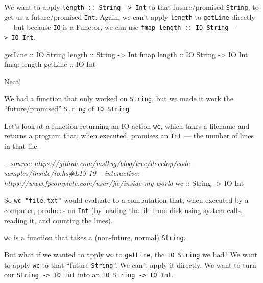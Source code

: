 \documentclass[]{article}
\newenvironment{Shaded}{}{}
\newcommand{\DataTypeTok}[1]{\textcolor[rgb]{0.56,0.13,0.00}{{#1}}}
\newcommand{\CommentTok}[1]{\textcolor[rgb]{0.38,0.63,0.69}{\textit{{#1}}}}
\newcommand{\OtherTok}[1]{\textcolor[rgb]{0.00,0.44,0.13}{{#1}}}
\newcommand{\NormalTok}[1]{{#1}}
\begin{document}
We want to apply \texttt{length\ ::\ String\ -\textgreater{}\ Int} to that future/promised
\texttt{String}, to get us a future/promised \texttt{Int}. Again, we can't apply \texttt{length} to
\texttt{getLine} directly --- but because \texttt{IO} is a Functor, we can use
\texttt{fmap\ length\ ::\ IO\ String\ -\textgreater{}\ IO\ Int}.

\begin{Shaded}
\begin{Highlighting}[]
\NormalTok{getLine}\OtherTok{             ::} \DataTypeTok{IO} \DataTypeTok{String}
\NormalTok{length}\OtherTok{              ::} \DataTypeTok{String} \OtherTok{->} \DataTypeTok{Int}
\NormalTok{fmap}\OtherTok{ length         ::} \DataTypeTok{IO} \DataTypeTok{String} \OtherTok{->} \DataTypeTok{IO} \DataTypeTok{Int}
\NormalTok{fmap length}\OtherTok{ getLine ::} \DataTypeTok{IO} \DataTypeTok{Int}
\end{Highlighting}
\end{Shaded}

Neat!

We had a function that only worked on \texttt{String}, but we made it work the ``future/promised''
\texttt{String} of \texttt{IO\ String}

Let's look at a function returning an IO action \texttt{wc}, which takes a filename and returns a
program that, when executed, promises an \texttt{Int} --- the number of lines in that file.

\begin{Shaded}
\begin{Highlighting}[]
\CommentTok{-- source: https://github.com/mstksg/blog/tree/develop/code-samples/inside/io.hs#L19-19}
\CommentTok{-- interactive: https://www.fpcomplete.com/user/jle/inside-my-world}
\OtherTok{wc ::} \DataTypeTok{String} \OtherTok{->} \DataTypeTok{IO} \DataTypeTok{Int}
\end{Highlighting}
\end{Shaded}

So \texttt{wc\ "file.txt"} would evaluate to a computation that, when executed by a computer,
produces an \texttt{Int} (by loading the file from disk using system calls, reading it, and counting
the lines).

\texttt{wc} is a function that takes a (non-future, normal) \texttt{String}.

But what if we wanted to apply \texttt{wc} to \texttt{getLine}, the \texttt{IO\ String} we had? We
want to apply \texttt{wc} to that ``future \texttt{String}''. We can't apply it directly. We want to
turn our \texttt{String\ -\textgreater{}\ IO\ Int} into an
\texttt{IO\ String\ -\textgreater{}\ IO\ Int}.
\end{document}
